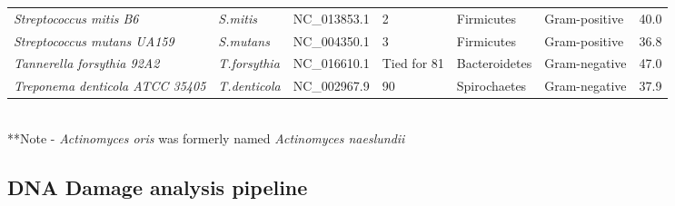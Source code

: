 \documentclass[12pt, a4paper]{article}
\begin{document}
\begin{landscape}
\begin{table}[h]
\begin{tabular}{C{7cm} C{2.5cm} C{3.5cm} C{2cm} C{2.5cm} C{2.5cm} C{1.5cm} }
		{\textit{Streptococcus mitis B6}}&{\textit{S.mitis}}&{NC\_013853.1}&{2}&{Firmicutes}&{Gram-positive}&{40.0}\\[5pt]
		{\textit{Streptococcus mutans UA159}}&{\textit{S.mutans}}&{NC\_004350.1}&{3}&{Firmicutes}&{Gram-positive}&{36.8}\\[5pt]
		{\textit{Tannerella forsythia 92A2}}&{\textit{T.forsythia}}&{NC\_016610.1}&{Tied for 81}&{Bacteroidetes}&{Gram-negative}&{47.0}\\[5pt]
		{\textit{Treponema denticola ATCC 35405}}&{\textit{T.denticola}}&{NC\_002967.9}&{90}&{Spirochaetes}&{Gram-negative}&{37.9}\\
		\bottomrule
		\end{tabular}
		\\[10pt]		
		**Note - \textit{Actinomyces oris} was formerly named \textit{Actinomyces naeslundii}

\end{table}
\end{landscape}

\subsection{DNA Damage analysis pipeline}
\end{document}

